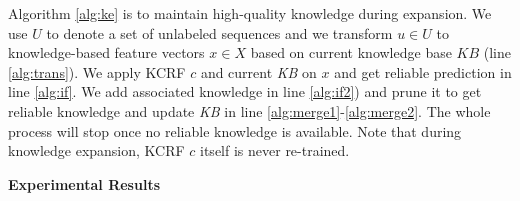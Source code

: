 
Algorithm \ref{alg:ke} is to maintain high-quality knowledge during expansion. We use $U$ to denote a set of unlabeled sequences and we transform $u\in U$ to knowledge-based feature vectors $x\in X$ based on current knowledge base $\textit{KB}$ (line \ref{alg:trans}). We apply KCRF $c$ and current \textit{KB} on $x$ and get reliable prediction in line \ref{alg:if}. We add associated knowledge in line \ref{alg:if2}) and prune it to get reliable knowledge and update \textit{KB} in line \ref{alg:merge1}-\ref{alg:merge2}. The whole process will stop once no reliable knowledge is available. Note that during knowledge expansion, KCRF $c$ itself is never re-trained.

\textbf{Experimental Results}
\label{chap6:sec:cer2:exp}

